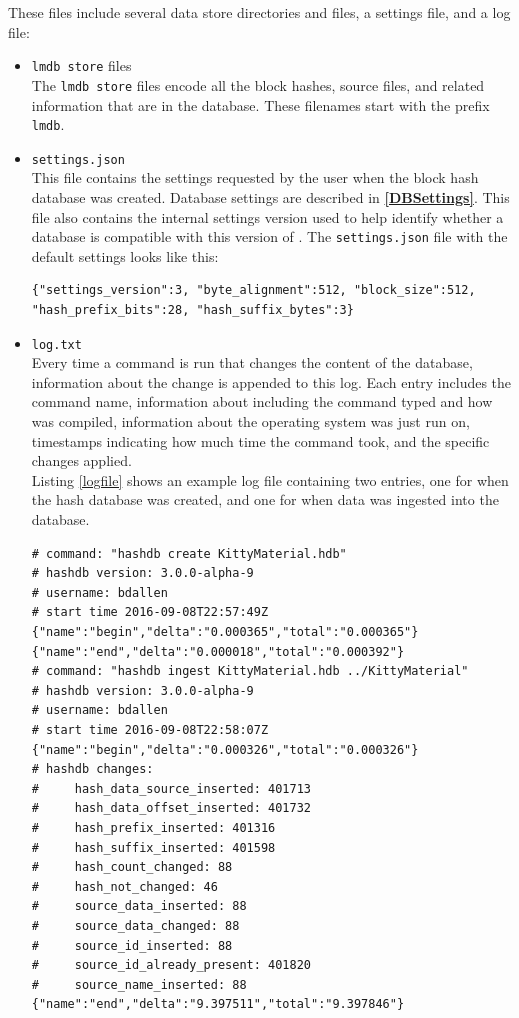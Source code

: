 \documentclass[11pt,fleqn]{article} %
\begin{document}
These files include several data store directories and files, a settings file, and a log file:

\begin{itemize}
\item \texttt{lmdb store} files \\
The \texttt{lmdb store} files encode all the block hashes, source files, and related information that are in the database. These filenames start with the prefix \verb+lmdb+.

\item \texttt{settings.json} \\
This file contains the settings requested by the user when the block hash database was created. Database settings are described in \textbf{\autoref{DBSettings}}. This file also contains the internal \hdb settings version used to help \hdb identify whether a database is compatible with this version of \hdb. The \texttt{settings.json} file with the default settings looks like this:

\begingroup
\footnotesize
\begin{Verbatim}[fontfamily=courier]
{"settings_version":3, "byte_alignment":512, "block_size":512,
"hash_prefix_bits":28, "hash_suffix_bytes":3}
\end{Verbatim}
\endgroup

\item \texttt{log.txt} \\
Every time a command is run that changes the content of the database, information about the change is appended to this log.  Each entry includes the command name, information about \hdb including the command typed and how \hdb was compiled, information about the operating system \hdb was just run on, timestamps indicating how much time the command took, and the specific \hdb changes applied.\\

Listing \ref{logfile} shows an example log file containing two entries, one for when the hash database was created, and one for when data was ingested into the database.

\lstset{style=customfile}
\begin{lstlisting}[float, caption=An example \texttt{log.xml} log file showing a database creation entry and a datase ingest entry, label=logfile]
# command: "hashdb create KittyMaterial.hdb"
# hashdb version: 3.0.0-alpha-9
# username: bdallen
# start time 2016-09-08T22:57:49Z
{"name":"begin","delta":"0.000365","total":"0.000365"}
{"name":"end","delta":"0.000018","total":"0.000392"}
# command: "hashdb ingest KittyMaterial.hdb ../KittyMaterial"
# hashdb version: 3.0.0-alpha-9
# username: bdallen
# start time 2016-09-08T22:58:07Z
{"name":"begin","delta":"0.000326","total":"0.000326"}
# hashdb changes:
#     hash_data_source_inserted: 401713
#     hash_data_offset_inserted: 401732
#     hash_prefix_inserted: 401316
#     hash_suffix_inserted: 401598
#     hash_count_changed: 88
#     hash_not_changed: 46
#     source_data_inserted: 88
#     source_data_changed: 88
#     source_id_inserted: 88
#     source_id_already_present: 401820
#     source_name_inserted: 88
{"name":"end","delta":"9.397511","total":"9.397846"}
\end{lstlisting}



\end{itemize}
\end{document}
